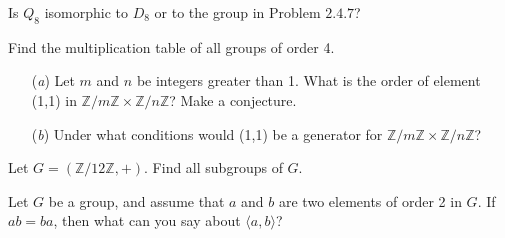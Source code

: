 \documentclass[12pt,letterpaper,boxed]{hmcpset}
\begin{document}

\begin{problem}[2.4.8]
Is $Q_8$ isomorphic to $D_8$ or to the group in Problem $\textit{2.4.7}$?
\end{problem}

\begin{solution}

\end{solution}

\clearpage

\begin{problem}[2.4.9]
Find the multiplication table of all groups of order 4. 
\end{problem}

\begin{solution}
\end{solution}

\clearpage

\begin{problem}[2.5.7]
\begin{itemize}
  \item[(\textit{a})] Let $m$ and $n$ be integers greater than 1. What is the order of element (1,1) in $\mathbb{Z}/m\mathbb{Z} \times \mathbb{Z}/n\mathbb{Z}$? Make a conjecture. 
  
  \item[(\textit{b})] Under what conditions would (1,1) be a generator for $\mathbb{Z}/m\mathbb{Z} \times \mathbb{Z}/n\mathbb{Z}$?
\end{itemize}
\end{problem}

\begin{solution}
\end{solution}

\clearpage


\begin{problem}[2.6.2]
Let $G = (\mathbb{Z}/12\mathbb{Z},+)$. Find all subgroups of $G$.
\end{problem}

\begin{solution}
\end{solution}

\clearpage

\begin{problem}[2.6.9]
Let $G$ be a group, and assume that $a$ and $b$ are two elements of order 2 in $G$. If $ab=ba$, then what can you say about $\langle a,b \rangle$?
\end{problem}

\begin{solution}

\end{solution}
\end{document}
